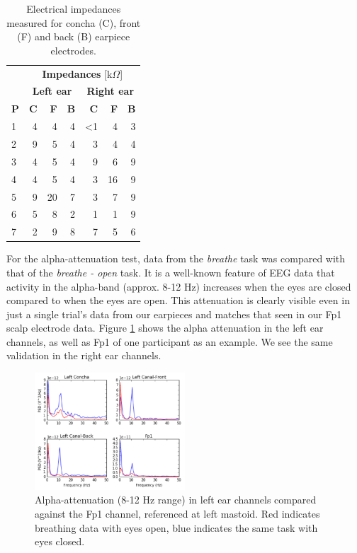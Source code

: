 \documentclass{sigchi}
\begin{document}
\begin{table}[h]
\begin{center}
\begin{tabular}{lrrrrrr}
& \multicolumn{6}{c}{\textbf{Impedances} [k\(\Omega\)]} \\
\cline{2-7}
& \multicolumn{3}{|c|}{\textbf{Left ear}} & \multicolumn{3}{c|}{\textbf{Right ear}} \\
\textbf{P} & \textbf{C} & \textbf{F} & \textbf{B} & \textbf{C} & \textbf{F} & \textbf{B} \\
\hline
1 & 4 & 4 & 4 & \textless1 & 4 & 3\\
2 & 9 & 5 & 4 & 3 & 4 & 4\\
3 & 4 & 5 & 4 & 9 & 6 & 9\\
4 & 4 & 5 & 4 & 3 & 16 & 9\\
5 & 9 & 20 & 7 & 3 & 7 & 9\\
6 & 5 & 8 & 2 & 1 & 1 & 9\\
7 & 2 & 9 & 8 & 7 & 5 & 6\\
\end{tabular}
\end{center}
\caption{Electrical impedances measured for concha (C), front (F) and back (B) earpiece electrodes.}
\label{tab:impedances}
\end{table}

For the alpha-attenuation test, data from the \textit{breathe} task was compared with that of the \textit{breathe - open} task. It is a well-known feature of EEG data that activity in the alpha-band (approx. 8-12 Hz) increases when the eyes are closed compared to when the eyes are open. This attenuation is clearly visible even in just a single trial's data from our earpieces and matches that seen in our Fp1 scalp electrode data. Figure \ref{fig:alpha_atten} shows the alpha attenuation in the left ear channels, as well as Fp1 of one participant as an example. We see the same validation in the right ear channels.

\begin{figure}[h]
\centering
\includegraphics[width=0.5\textwidth]{figures/002_AlphaAtt_all.jpg}
\caption{Alpha-attenuation (8-12 Hz range) in left ear channels compared against the Fp1 channel, referenced at left mastoid. Red indicates breathing data with eyes open, blue indicates the same task with eyes closed.}
\label{fig:alpha_atten}
\end{figure}
\end{document}
